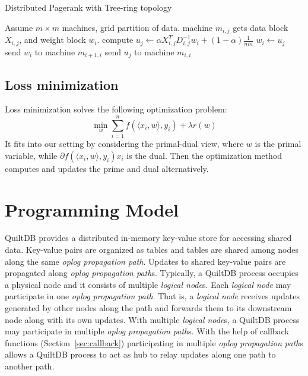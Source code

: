 \documentclass[11pt, twocolumn]{article}
\begin{document}
\begin{algorithm}[tb]
  \caption{Distributed Pagerank with Tree-ring topology}
  \label{algo:pr2}
  \begin{algorithmic}[1]
    \REQUIRE Assume $m\times m$ machines, grid partition of data. machine
    $m_{i,j}$  gets data block $X_{i,j}$, and weight block $w_i$.
    \STATE compute $u_j \gets \alpha X_{i,j}^T D_{i,j}^{-1} w_i + (1-\alpha)\frac{1}{nm}$
    \STATE $w_i \gets u_j$
    \STATE send $w_i$ to machine $m_{i+1,i}$
    \ELSE
    \STATE send $u_j$ to machine $m_{i,i}$
    \ENDIF
    \ENDFOR
    \ENDFOR
  \end{algorithmic}
\end{algorithm}
\subsection{Loss minimization}

Loss minimization solves the following optimization problem:
\begin{equation}
  \min_w \sum_{i=1}^{n} f(\langle x_i, w\rangle, y_i) + \lambda r(w)
\end{equation}
It fits into our setting by considering the primal-dual view, where $w$ is the primal
variable, while $\partial f(\langle x_i, w\rangle, y_i) x_i$ is the dual. Then
the optimization method computes and updates the prime and dual alternatively.

\section{Programming Model}

QuiltDB provides a distributed in-memory key-value store for accessing shared
data. Key-value pairs are organized as tables and tables are shared among
nodes along the same \emph{oplog propagation path}. Updates to shared key-value
pairs are propagated along \emph{oplog propagation path}s. Typically, a QuiltDB
process occupies a physical node and it
consists of multiple \emph{logical node}s. Each \emph{logical node} may
participate in one \emph{oplog propagation path}. That is, a \emph{logical node}
receives updates generated by other nodes along the path and forwards them to
its downstream node along with its own updates. With multiple \emph{logical
node}s, a QuiltDB process may participate in multiple \emph{oplog propagation
path}s. With the help of callback functions (Section~\ref{sec:callback})
participating in multiple \emph{oplog propagation path}s
allows a QuiltDB process to act as hub to relay updates along one path to
another path.
\end{document}
